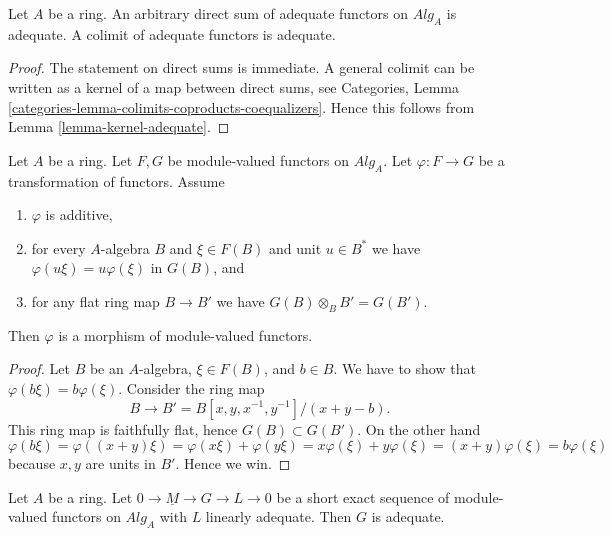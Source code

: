 \begin{lemma}
\label{lemma-colimit-adequate}
Let $A$ be a ring.
An arbitrary direct sum of adequate functors on $\textit{Alg}_A$
is adequate. A colimit of adequate functors is adequate.
\end{lemma}

\begin{proof}
The statement on direct sums is immediate.
A general colimit can be written as a kernel of a map between
direct sums, see
Categories, Lemma \ref{categories-lemma-colimits-coproducts-coequalizers}.
Hence this follows from
Lemma \ref{lemma-kernel-adequate}.
\end{proof}

\begin{lemma}
\label{lemma-flat-linear-functor}
Let $A$ be a ring.
Let $F, G$ be module-valued functors on $\textit{Alg}_A$.
Let $\varphi : F \to G$ be a transformation of functors. Assume
\begin{enumerate}
\item $\varphi$ is additive,
\item for every $A$-algebra $B$ and $\xi \in F(B)$ and unit
$u \in B^*$ we have $\varphi(u\xi) = u\varphi(\xi)$ in $G(B)$, and
\item for any flat ring map $B \to B'$ we have
$G(B) \otimes_B B' = G(B')$.
\end{enumerate}
Then $\varphi$ is a morphism of module-valued functors.
\end{lemma}

\begin{proof}
Let $B$ be an $A$-algebra, $\xi \in F(B)$, and $b \in B$. We have to show
that $\varphi(b \xi) = b \varphi(\xi)$. Consider the ring map
$$
B \to B' = B[x, y, x^{-1}, y^{-1}]/(x + y - b).
$$
This ring map is faithfully flat, hence $G(B) \subset G(B')$. On the
other hand
$$
\varphi(b\xi) = \varphi((x + y)\xi) =
\varphi(x\xi) + \varphi(y\xi) = x\varphi(\xi) + y\varphi(\xi)
= (x + y)\varphi(\xi) = b\varphi(\xi)
$$
because $x, y$ are units in $B'$. Hence we win.
\end{proof}

\begin{lemma}
\label{lemma-extension-adequate-key}
Let $A$ be a ring.
Let $0 \to \underline{M} \to G \to L \to 0$ be a short exact sequence
of module-valued functors on $\textit{Alg}_A$ with $L$ linearly adequate.
Then $G$ is adequate.
\end{lemma}

